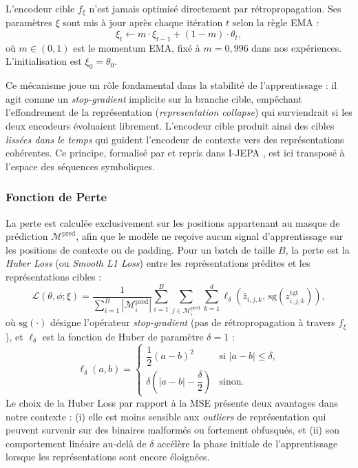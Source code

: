 L'encodeur cible $f_\xi$ n'est jamais optimisé directement par
rétropropagation. Ses paramètres $\xi$ sont mis à jour après chaque
itération $t$ selon la règle EMA :
\begin{equation}
  \xi_t \leftarrow m \cdot \xi_{t-1} + (1-m) \cdot \theta_t,
  \label{eq:ema}
\end{equation}
où $m \in (0,1)$ est le momentum EMA, fixé à $m = 0{,}996$ dans
nos expériences. L'initialisation est $\xi_0 = \theta_0$.
 
Ce mécanisme joue un rôle fondamental dans la stabilité de
l'apprentissage : il agit comme un \emph{stop-gradient} implicite
sur la branche cible, empêchant l'effondrement de la représentation
(\emph{representation collapse}) qui surviendrait si les deux
encodeurs évoluaient librement. L'encodeur cible produit ainsi des
cibles \emph{lissées dans le temps} qui guident l'encodeur de
contexte vers des représentations cohérentes. Ce principe,
formalisé par \cite{grill2020byol} et repris dans
I-JEPA \cite{assran2023self}, est ici transposé à l'espace des
séquences symboliques.
 

\subsubsection{Fonction de Perte}
\label{sub:loss}
 
La perte est calculée exclusivement sur les positions appartenant
au masque de prédiction $\mathcal{M}^{\text{pred}}$, afin que le
modèle ne reçoive aucun signal d'apprentissage sur les positions
de contexte ou de padding. Pour un batch de taille $B$, la perte
est la \emph{Huber Loss} (ou \emph{Smooth L1 Loss}) entre les
représentations prédites et les représentations cibles :
\begin{equation}
  \mathcal{L}(\theta, \phi ; \xi) =
  \frac{1}{\sum_{i=1}^{B}|\mathcal{M}^{\text{pred}}_i|}
  \sum_{i=1}^{B}
  \sum_{j \in \mathcal{M}^{\text{pred}}_i}
  \sum_{k=1}^{d}
  \ell_{\delta}\!\left(\hat{z}_{i,j,k},\,
    \mathrm{sg}\!\left(z^{\text{tgt}}_{i,j,k}\right)\right),
  \label{eq:loss}
\end{equation}
où $\mathrm{sg}(\cdot)$ désigne l'opérateur \emph{stop-gradient}
(pas de rétropropagation à travers $f_\xi$), et $\ell_\delta$ est
la fonction de Huber de paramètre $\delta = 1$ :
\[
  \ell_\delta(a, b) =
  \begin{cases}
    \dfrac{1}{2}(a-b)^2          & \text{si } |a-b| \le \delta,\\[6pt]
    \delta\!\left(|a-b| - \dfrac{\delta}{2}\right) & \text{sinon.}
  \end{cases}
\]
Le choix de la Huber Loss par rapport à la MSE présente deux
avantages dans notre contexte : (i) elle est moins sensible aux
\emph{outliers} de représentation qui peuvent survenir sur des
binaires malformés ou fortement obfusqués, et (ii) son comportement
linéaire au-delà de $\delta$ accélère la phase initiale de
l'apprentissage lorsque les représentations sont encore éloignées.
 
